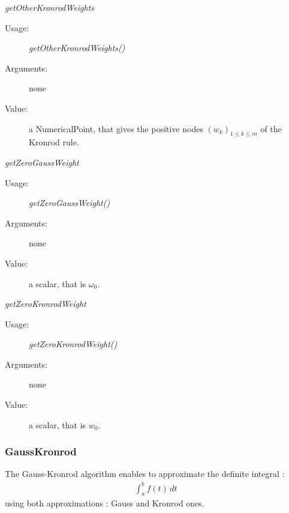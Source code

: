 \begin{description}
\begin{description}
  \item \textit{getOtherKronrodWeights}
    \begin{description}
    \item[Usage:] \textit{getOtherKronrodWeights()}
    \item[Arguments:] none
    \item[Value:]  a NumericalPoint, that gives the positive nodes $(w_k)_{1 \leq k \leq m}$ of the Kronrod rule.
    \end{description}
    \bigskip

  \item \textit{getZeroGaussWeight}
    \begin{description}
    \item[Usage:] \textit{getZeroGaussWeight()}
    \item[Arguments:] none
    \item[Value:]  a scalar, that is $\omega_0$.
    \end{description}
    \bigskip

  \item \textit{getZeroKronrodWeight}
    \begin{description}
    \item[Usage:] \textit{getZeroKronrodWeight()}
    \item[Arguments:] none
    \item[Value:]  a scalar, that is $w_0$.
    \end{description}

  \end{description}

\end{description}

\subsubsection{GaussKronrod}

The Gauss-Kronrod algorithm enables to approximate the definite integral :
\begin{align}\label{integral}
  \int_{a}^b f(t)\, dt
\end{align}
using both approximations : Gauss and Kronrod ones.

